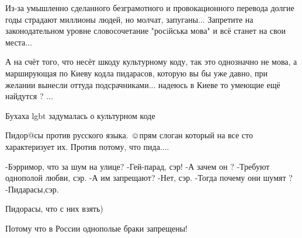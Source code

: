 \begin{itemize}
Из-за умышленно сделанного безграмотного и провокационного перевода долгие годы
страдают миллионы людей, но молчат, запуганы... Запретите на законодательном
уровне словосочетание "росiйська мова" и всё станет на свои места...

А на счёт того, что несёт шкоду культурному коду, так это однозначно не мова, а
марширующая по Киеву кодла пидарасов, которую вы бы уже давно, при желании
вынесли оттуда подсрачниками... надеюсь в Киеве то умеющие ещё найдутся ?
...🍷😎

 
Бухаха lgbt задумалась о культурном коде

 
Пидор@сы против русского языка. ☺прям слоган который на все сто характеризует их. Против потому, что пида....

 

\obeycr
-Бэрримор, что за шум на улице?
-Гей-парад, сэр!
-А зачем он ?
-Требуют однополой любви, сэр.
-А им запрещают?
-Нет, сэр.
-Тогда почему они шумят ?
-Пидарасы,сэр.
\restorecr

 
Пидорасы, что с них взять)

 
Потому что в России однополые браки запрещены!


\end{itemize}
